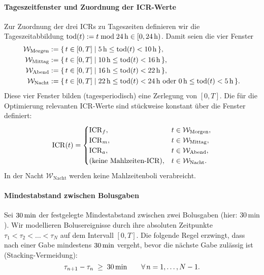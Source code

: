 \paragraph{Tageszeitfenster und Zuordnung der ICR-Werte}
Zur Zuordnung der drei ICRs zu Tageszeiten definieren wir die Tageszeitabbildung \( \mathrm{tod}(t):= t \bmod 24\,\mathrm{h} \in [0,24\,\mathrm{h})\). Damit seien die vier Fenster
\[
\begin{aligned}
\mathcal{W}_{\mathrm{Morgen}} &:= \{\, t\in[0,T] \mid 5\,\mathrm{h} \le \mathrm{tod}(t) < 10\,\mathrm{h} \,\},\\
\mathcal{W}_{\mathrm{Mittag}} &:= \{\, t\in[0,T] \mid 10\,\mathrm{h} \le \mathrm{tod}(t) < 16\,\mathrm{h} \,\},\\
\mathcal{W}_{\mathrm{Abend}}  &:= \{\, t\in[0,T] \mid 16\,\mathrm{h} \le \mathrm{tod}(t) < 22\,\mathrm{h} \,\},\\
\mathcal{W}_{\mathrm{Nacht}}  &:= \{\, t\in[0,T] \mid 22\,\mathrm{h} \le \mathrm{tod}(t) < 24\,\mathrm{h} \ \text{oder}\ 0\,\mathrm{h} \le \mathrm{tod}(t) < 5\,\mathrm{h} \,\}.
\end{aligned}
\]
Diese vier Fenster bilden (tagesperiodisch) eine Zerlegung von \([0,T]\). Die für die Optimierung relevanten ICR-Werte sind stückweise konstant über die Fenster definiert:
\[
\mathrm{ICR}(t)=
\begin{cases}
\mathrm{ICR}_f, & t \in \mathcal{W}_{\mathrm{Morgen}},\\
\mathrm{ICR}_m, & t \in \mathcal{W}_{\mathrm{Mittag}},\\
\mathrm{ICR}_a, & t \in \mathcal{W}_{\mathrm{Abend}},\\
\text{(keine Mahlzeiten-ICR)}, & t \in \mathcal{W}_{\mathrm{Nacht}}.
\end{cases}
\]
\noindent In der Nacht \(\mathcal{W}_{\mathrm{Nacht}}\) werden keine Mahlzeitenboli verabreicht.
\medskip

\paragraph{Mindestabstand zwischen Bolusgaben}
Sei \(30\,\mathrm{min}\) der festgelegte Mindestabstand zwischen zwei Bolusgaben (hier: \(30\,\mathrm{min}\)). Wir modellieren Bolusereignisse durch ihre absoluten Zeitpunkte \(\tau_1<\tau_2<\dots<\tau_N\) auf dem Intervall \([0,T]\). Die folgende Regel erzwingt, dass nach einer Gabe mindestens \(30\,\mathrm{min}\) vergeht, bevor die nächste Gabe zulässig ist (Stacking-Vermeidung):
\[
\tau_{n+1} - \tau_n \;\ge\; 30\,\mathrm{min} \qquad \forall\, n=1,\dots,N-1.
\]